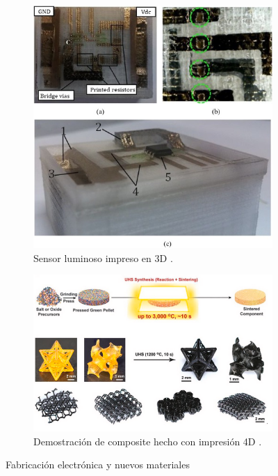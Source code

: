 \begin{itemize}
    \begin{figure}[h!]
        \centering
        \begin{subfigure}[h]{0.45\linewidth} 
            \centering
            \includegraphics[scale=0.3]{figuras/am_aplicaciones_electronica.jpg}
            \caption{Sensor luminoso impreso en 3D \cite{Bellacicca2018}.}
            \label{fig:am_aplicaciones_electronica}
        \end{subfigure}
        \begin{subfigure}[h]{0.45\linewidth} 
            \centering
            \includegraphics[scale=0.25]{figuras/am_aplicaciones_materiales.png}
            \caption{Demostración de composite hecho con impresión 4D \cite{Mahmood2023}.}
            \label{fig:am_aplicaciones_materiales}
        \end{subfigure}
        \caption{Fabricación electrónica y nuevos materiales}
        \label{fig:FDM_y_redrap}
    \end{figure}
    

\end{itemize}
